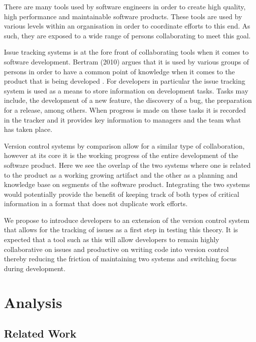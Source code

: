 \documentclass{mproj}
\begin{document}
There are many tools used by software engineers in order to create high quality, high performance and maintainable software products. These tools are used by various levels within an organisation in order to coordinate efforts to this end. As such, they are exposed to a wide range of persons collaborating to meet this goal.

Issue tracking systems is at the fore front of collaborating tools when it comes to software development. Bertram (2010) argues that it is used by various groups of persons in order to have a common point of knowledge when it comes to the product that is being developed \cite{Bertram:2010}. For developers in particular the issue tracking system is used as a means to store information on development tasks. Tasks may include, the development of a new feature, the discovery of a bug, the preparation for a release, among others. When progress is made on these tasks it is recorded in the tracker and it provides key information to managers and the team what has taken place.

Version control systems by comparison allow for a similar type of collaboration, however at its core it is the working progress of the entire development of the software product. Here we see the overlap of the two systems where one is related to the product as a working growing artifact and the other as a planning and knowledge base on segments of the software product. Integrating the two systems would potentially provide the benefit of keeping track of both types of critical information in a format that does not duplicate work efforts.

We propose to introduce developers to an extension of the version control system that allows for the tracking of issues as a first step in testing this theory. It is expected that a tool such as this will allow developers to remain highly collaborative on issues and productive on writing code into version control thereby reducing the friction of maintaining two systems and switching focus during development.

\chapter{Analysis}\label{analysis}

\section{Related Work}
\end{document}
